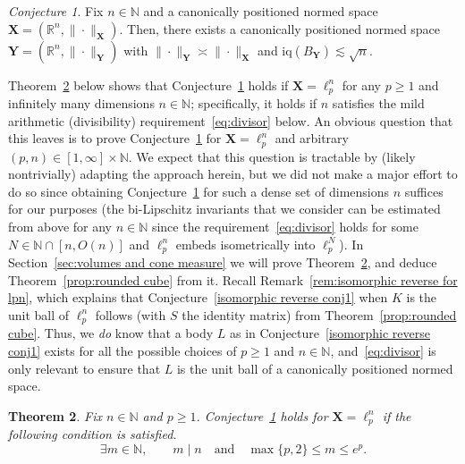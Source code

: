 \documentclass[11pt,reqno]{amsart}
\renewcommand{\le}{\leqslant}
\renewcommand{\ge}{\geqslant}
\newcommand{\X}{\mathbf X}
\newcommand{\Y}{\mathbf Y}
\newcommand{\R}{\mathbb R}
\newtheorem{theorem}{Theorem}
\theoremstyle{remark}
\newtheorem{conjecture}[theorem]{Conjecture}
\newcommand{\iq}{\mathrm{iq}}
\newcommand{\N}{\mathbb N}
\renewcommand{\1}{\mathbf 1}
\begin{document}
\begin{conjecture}\label{conj:reverse iso when canonical} Fix $n\in \N$ and a canonically positioned normed space $\X=(\R^n,\|\cdot\|_\X)$. Then, there exists a canonically positioned normed space $\Y=(\R^n,\|\cdot\|_\Y)$ with $\|\cdot\|_\Y\asymp\|\cdot\|_\X$ and $\iq(B_\Y)\lesssim \sqrt{n}$.
\end{conjecture}

Theorem~\ref{thm:strong conjecture for most lp} below shows that Conjecture~\ref{conj:reverse iso when canonical} holds if $\X=\ell_p^n$ for any $p\ge 1$  and infinitely many dimensions $n\in \N$; specifically, it holds if $n$ satisfies the mild arithmetic (divisibility) requirement~\eqref{eq:divisor} below. An obvious question that this leaves  is to prove Conjecture~\ref{conj:reverse iso when canonical} for $\X=\ell_p^n$ and arbitrary $(p,n)\in [1,\infty]\times \N$. We expect that this question is tractable by (likely nontrivially) adapting the approach herein, but we did not make a major effort to do so since obtaining  Conjecture~\ref{conj:reverse iso when canonical} for such a dense set of dimensions $n$ suffices for our purposes (the bi-Lipschitz invariants that we consider  can be estimated from above for any $n\in \N$ since the requirement~\eqref{eq:divisor} holds for some $N\in \N\cap[n,O(n)]$ and $\ell_p^n$ embeds isometrically into $\ell_p^N$). In Section~\ref{sec:volumes and cone measure} we will prove Theorem~\ref{thm:strong conjecture for most lp}, and deduce Theorem~\ref{prop:rounded cube}  from it. Recall Remark~\ref{rem:isomorphic reverse for lpn}, which explains that Conjecture~\ref{isomorphic reverse conj1} when $K$ is the unit ball of $\ell_p^n$ follows (with $S$ the identity matrix) from Theorem~\ref{prop:rounded cube}. Thus, we {\em do} know that a body $L$ as in Conjecture~\ref{isomorphic reverse conj1} exists for all the possible choices of $p\ge 1$ and $n\in \N$, and~\eqref{eq:divisor} is only relevant to ensure that $L$ is the unit ball of a canonically positioned normed space.




\begin{theorem}\label{thm:strong conjecture for most lp}
Fix $n\in \N$ and $p\ge 1$. Conjecture~\ref{conj:reverse iso when canonical} holds for $\X=\ell_p^n$ if the following condition is satisfied.
\begin{equation}\label{eq:divisor}
\exists m\in \N,\qquad m\mid n\quad\mathrm{and}\quad \max\{p,2\}\le m\le e^p.
\end{equation}
\end{theorem}
\end{document}

